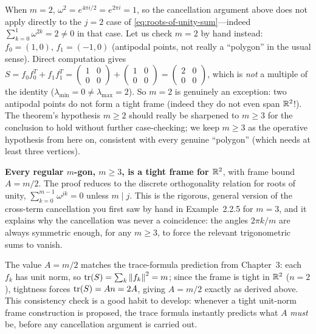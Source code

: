 \begin{remark*}[The case $m=2$]
\label{rmk:m-equals-2}
When $m=2$, $\omega^2=e^{4\pi i/2}=e^{2\pi i}=1$, so the cancellation
argument above does not apply directly to the $j=2$ case of
\eqref{eq:roots-of-unity-sum}---indeed $\sum_{k=0}^1\omega^{2k}=2\ne 0$ in
that case. Let us check $m=2$ by hand instead: $f_0=(1,0)$,
$f_1=(-1,0)$ (antipodal points, not really a ``polygon'' in the usual
sense). Direct computation gives $S = f_0f_0^T+f_1f_1^T =
\begin{pmatrix}1&0\\0&0\end{pmatrix}+\begin{pmatrix}1&0\\0&0\end{pmatrix}
=\begin{pmatrix}2&0\\0&0\end{pmatrix}$, which is \emph{not} a multiple of
the identity ($\lambda_{\min}=0\ne\lambda_{\max}=2$). So $m=2$ is
genuinely an exception: two antipodal points do not form a tight frame
(indeed they do not even span $\mathbb{R}^2$!). The theorem's hypothesis $m\ge2$
should really be sharpened to $m\ge3$ for the conclusion to hold without
further case-checking; we keep $m \ge 3$ as the operative hypothesis from
here on, consistent with every genuine ``polygon'' (which needs at least
three vertices).
\end{remark*}

\begin{keyidea}
\textbf{Every regular $m$-gon, $m\ge3$, is a tight frame for $\mathbb{R}^2$},
with frame bound $A = m/2$. The proof reduces to the discrete
orthogonality relation for roots of unity,
$\sum_{k=0}^{m-1}\omega^{jk}=0$ unless $m\mid j$. This is the rigorous,
general version of the cross-term cancellation you first saw by hand in
Example~2.2.5 for $m=3$, and it explains why the cancellation was never a
coincidence: the angles $2\pi k/m$ are always symmetric enough, for any
$m\ge3$, to force the relevant trigonometric sums to vanish.
\end{keyidea}

\begin{remark*}
The value $A=m/2$ matches the trace-formula prediction from
Chapter~3: each $f_k$ has unit norm, so $\operatorname{tr}(S)=\sum_k\left\| f_k \right\|^2=m$;
since the frame is tight in $\mathbb{R}^2$ ($n=2$), tightness forces
$\operatorname{tr}(S)=An=2A$, giving $A=m/2$ exactly as derived above. This consistency
check is a good habit to develop: whenever a tight unit-norm frame
construction is proposed, the trace formula instantly predicts what $A$
\emph{must} be, before any cancellation argument is carried out.
\end{remark*}

